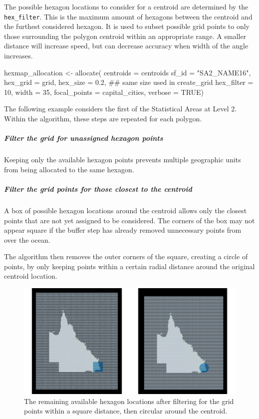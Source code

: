 The possible hexagon locations to consider for a centroid are determined
by the \texttt{hex\_filter}. This is the maximum amount of hexagons
between the centroid and the furthest considered hexagon. It is used to
subset possible grid points to only those surrounding the polygon
centroid within an appropriate range. A smaller distance will increase
speed, but can decrease accuracy when width of the angle increases.

\begin{Schunk}
\begin{Sinput}
hexmap_allocation <- allocate(
  centroids = centroids %
  sf_id = "SA2_NAME16",
  hex_grid = grid,
  hex_size = 0.2, ## same size used in create_grid
  hex_filter = 10,
  width = 35,
  focal_points = capital_cities,
  verbose = TRUE)
\end{Sinput}
\end{Schunk}

The following example considers the first of the Statistical Areas at
Level 2. Within the algorithm, these steps are repeated for each
polygon.

\hypertarget{filter-the-grid-for-unassigned-hexagon-points}{%
\subparagraph{Filter the grid for unassigned hexagon
points}\label{filter-the-grid-for-unassigned-hexagon-points}}

Keeping only the available hexagon points prevents multiple geographic
units from being allocated to the same hexagon.

\hypertarget{filter-the-grid-points-for-those-closest-to-the-centroid}{%
\subparagraph{Filter the grid points for those closest to the
centroid}\label{filter-the-grid-points-for-those-closest-to-the-centroid}}

A box of possible hexagon locations around the centroid allows only the
closest points that are not yet assigned to be considered. The corners
of the box may not appear square if the buffer step has already removed
unnecessary points from over the ocean.

The algorithm then removes the outer corners of the square, creating a
circle of points, by only keeping points within a certain radial
distance around the original centroid location.

\begin{figure}[h]
\centering
\includegraphics[width=16cm]{figures/4grid.pdf}
\caption{\label{fig:buffers}The remaining available hexagon locations after filtering for the grid points within a square distance, then circular around the centroid.}
\end{figure}


